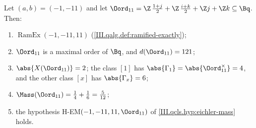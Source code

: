 Let $(a,b)=(-1,-11)$ and let $\Oord_{11}=\Z\,\tfrac{1+j}2+\Z\,\tfrac{i+k}2+\Z j+\Z k\subseteq\Bq$. Then:
\begin{enumerate}[label=(\alph*)]
\item $\operatorname{RamEx}(-1,-11,11)$ (\cref{III.qalg.def:ramified-exactly});
\item $\Oord_{11}$ is a maximal order of $\Bq$, and $d(\Oord_{11})=121$;
\item $\abs{X(\Oord_{11})}=2$; the class $[1]$ has $\abs{\Gamma_1}=\abs{\Oord_{11}^\times}=4$, and the other class $[x]$ has $\abs{\Gamma_x}=6$;
\item $\Mass(\Oord_{11})=\frac14+\frac16=\frac5{12}$;
\item the hypothesis H-EM$(-1,-11,11,\Oord_{11})$ of \cref{III.qcls.hyp:eichler-mass} holds.
\end{enumerate}

